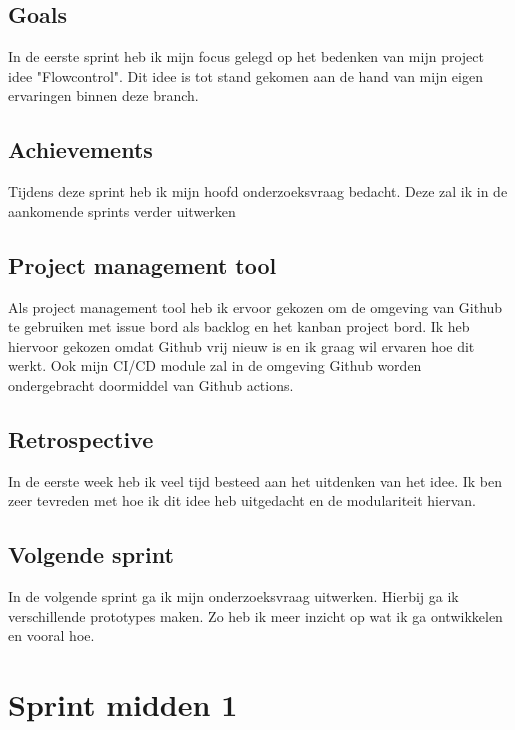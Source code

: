 \documentclass[11pt, twoside]{report}
\begin{document}
    \subsection{Goals}\label{subsec:goals-0}
    In de eerste sprint heb ik mijn focus gelegd op het bedenken van mijn project idee "Flowcontrol".
    Dit idee is tot stand gekomen aan de hand van mijn eigen ervaringen binnen deze branch.

    \subsection{Achievements}\label{subsec:achievements-0}
    Tijdens deze sprint heb ik mijn hoofd onderzoeksvraag bedacht.
    Deze zal ik in de aankomende sprints verder uitwerken

    \subsection{Project management tool}\label{subsec:project-management-tool}
    Als project management tool heb ik ervoor gekozen om de omgeving van Github te gebruiken met issue bord als
    backlog en het kanban project bord.
    Ik heb hiervoor gekozen omdat Github vrij nieuw is en ik graag wil ervaren hoe dit werkt.
    Ook mijn CI/CD module zal in de omgeving Github worden ondergebracht doormiddel van Github actions.

    \subsection{Retrospective}\label{subsec:retrospective-0}
    In de eerste week heb ik veel tijd besteed aan het uitdenken van het idee.
    Ik ben zeer tevreden met hoe ik dit idee heb uitgedacht en de modulariteit hiervan.

    \subsection{Volgende sprint}\label{subsec:volgende-sprint-0}
    In de volgende sprint ga ik mijn onderzoeksvraag uitwerken.
    Hierbij ga ik verschillende prototypes maken.
    Zo heb ik meer inzicht op wat ik ga ontwikkelen en vooral hoe.

    \newpage
    \section{Sprint midden 1}
    \label{sec:sprint-1}
\end{document}

